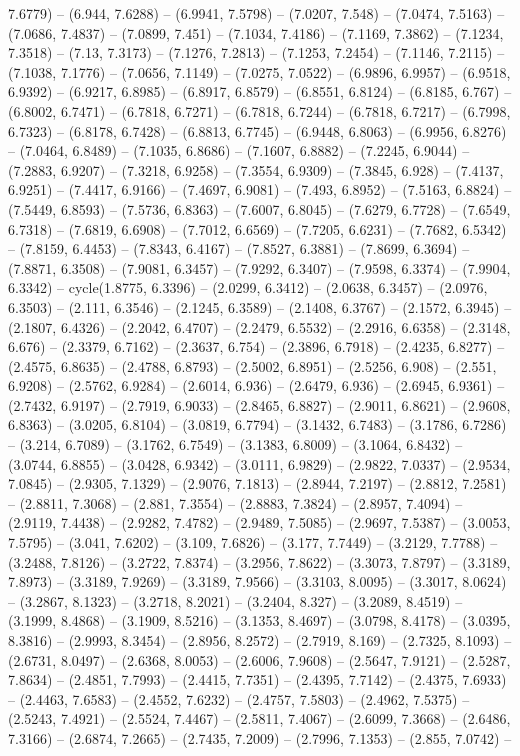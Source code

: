 7.6779) -- (6.944, 7.6288) -- (6.9941, 7.5798) -- (7.0207, 7.548) -- (7.0474, 7.5163) -- (7.0686, 7.4837) -- (7.0899, 7.451) -- (7.1034, 7.4186) -- (7.1169, 7.3862) -- (7.1234, 7.3518) -- (7.13, 7.3173) -- (7.1276, 7.2813) -- (7.1253, 7.2454) -- (7.1146, 7.2115) -- (7.1038, 7.1776) -- (7.0656, 7.1149) -- (7.0275, 7.0522) -- (6.9896, 6.9957) -- (6.9518, 6.9392) -- (6.9217, 6.8985) -- (6.8917, 6.8579) -- (6.8551, 6.8124) -- (6.8185, 6.767) -- (6.8002, 6.7471) -- (6.7818, 6.7271) -- (6.7818, 6.7244) -- (6.7818, 6.7217) -- (6.7998, 6.7323) -- (6.8178, 6.7428) -- (6.8813, 6.7745) -- (6.9448, 6.8063) -- (6.9956, 6.8276) -- (7.0464, 6.8489) -- (7.1035, 6.8686) -- (7.1607, 6.8882) -- (7.2245, 6.9044) -- (7.2883, 6.9207) -- (7.3218, 6.9258) -- (7.3554, 6.9309) -- (7.3845, 6.928) -- (7.4137, 6.9251) -- (7.4417, 6.9166) -- (7.4697, 6.9081) -- (7.493, 6.8952) -- (7.5163, 6.8824) -- (7.5449, 6.8593) -- (7.5736, 6.8363) -- (7.6007, 6.8045) -- (7.6279, 6.7728) -- (7.6549, 6.7318) -- (7.6819, 6.6908) -- (7.7012, 6.6569) -- (7.7205, 6.6231) -- (7.7682, 6.5342) -- (7.8159, 6.4453) -- (7.8343, 6.4167) -- (7.8527, 6.3881) -- (7.8699, 6.3694) -- (7.8871, 6.3508) -- (7.9081, 6.3457) -- (7.9292, 6.3407) -- (7.9598, 6.3374) -- (7.9904, 6.3342) -- cycle(1.8775, 6.3396) -- (2.0299, 6.3412) -- (2.0638, 6.3457) -- (2.0976, 6.3503) -- (2.111, 6.3546) -- (2.1245, 6.3589) -- (2.1408, 6.3767) -- (2.1572, 6.3945) -- (2.1807, 6.4326) -- (2.2042, 6.4707) -- (2.2479, 6.5532) -- (2.2916, 6.6358) -- (2.3148, 6.676) -- (2.3379, 6.7162) -- (2.3637, 6.754) -- (2.3896, 6.7918) -- (2.4235, 6.8277) -- (2.4575, 6.8635) -- (2.4788, 6.8793) -- (2.5002, 6.8951) -- (2.5256, 6.908) -- (2.551, 6.9208) -- (2.5762, 6.9284) -- (2.6014, 6.936) -- (2.6479, 6.936) -- (2.6945, 6.9361) -- (2.7432, 6.9197) -- (2.7919, 6.9033) -- (2.8465, 6.8827) -- (2.9011, 6.8621) -- (2.9608, 6.8363) -- (3.0205, 6.8104) -- (3.0819, 6.7794) -- (3.1432, 6.7483) -- (3.1786, 6.7286) -- (3.214, 6.7089) -- (3.1762, 6.7549) -- (3.1383, 6.8009) -- (3.1064, 6.8432) -- (3.0744, 6.8855) -- (3.0428, 6.9342) -- (3.0111, 6.9829) -- (2.9822, 7.0337) -- (2.9534, 7.0845) -- (2.9305, 7.1329) -- (2.9076, 7.1813) -- (2.8944, 7.2197) -- (2.8812, 7.2581) -- (2.8811, 7.3068) -- (2.881, 7.3554) -- (2.8883, 7.3824) -- (2.8957, 7.4094) -- (2.9119, 7.4438) -- (2.9282, 7.4782) -- (2.9489, 7.5085) -- (2.9697, 7.5387) -- (3.0053, 7.5795) -- (3.041, 7.6202) -- (3.109, 7.6826) -- (3.177, 7.7449) -- (3.2129, 7.7788) -- (3.2488, 7.8126) -- (3.2722, 7.8374) -- (3.2956, 7.8622) -- (3.3073, 7.8797) -- (3.3189, 7.8973) -- (3.3189, 7.9269) -- (3.3189, 7.9566) -- (3.3103, 8.0095) -- (3.3017, 8.0624) -- (3.2867, 8.1323) -- (3.2718, 8.2021) -- (3.2404, 8.327) -- (3.2089, 8.4519) -- (3.1999, 8.4868) -- (3.1909, 8.5216) -- (3.1353, 8.4697) -- (3.0798, 8.4178) -- (3.0395, 8.3816) -- (2.9993, 8.3454) -- (2.8956, 8.2572) -- (2.7919, 8.169) -- (2.7325, 8.1093) -- (2.6731, 8.0497) -- (2.6368, 8.0053) -- (2.6006, 7.9608) -- (2.5647, 7.9121) -- (2.5287, 7.8634) -- (2.4851, 7.7993) -- (2.4415, 7.7351) -- (2.4395, 7.7142) -- (2.4375, 7.6933) -- (2.4463, 7.6583) -- (2.4552, 7.6232) -- (2.4757, 7.5803) -- (2.4962, 7.5375) -- (2.5243, 7.4921) -- (2.5524, 7.4467) -- (2.5811, 7.4067) -- (2.6099, 7.3668) -- (2.6486, 7.3166) -- (2.6874, 7.2665) -- (2.7435, 7.2009) -- (2.7996, 7.1353) -- (2.855, 7.0742) -- 